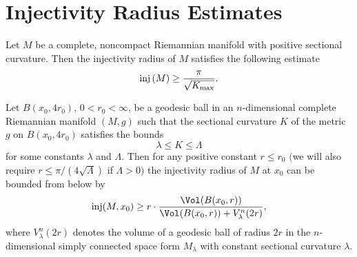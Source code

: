 \section{Injectivity Radius Estimates}
\begin{theorem}
  \label{thm:cz-gromollmeyer-injectivity-radius-estimate}
 Let $M$
be a complete, noncompact Riemannian manifold with positive
sectional curvature. Then the injectivity radius of $M$ satisfies
the following estimate
$$
{\rm inj}\,(M)\geq\frac{\pi}{\sqrt{K_{\max}}}.
$$
\end{theorem}
\begin{theorem}
  \label{thm:cz-local-injectivity-radius-estimate-from-volume-and-curvature}
Let $B(x_0, 4r_0)$, $0<r_0<\infty$, be a geodesic ball in an
$n$-dimensional complete Riemannian manifold $(M,g)$ such that the
sectional curvature $K$ of the metric $g$ on $B(x_0,4r_0)$
satisfies the bounds
$$
\lambda\leq K\leq\Lambda
$$
for some constants $\lambda$ and $\Lambda$. Then for any positive
constant $r\le r_0$ $($we will also require $r\le
\pi/(4\sqrt{\Lambda})$ if $\Lambda>0)$ the injectivity radius of
$M$ at $x_0$ can be bounded from below by
$$
\mbox{\rm inj}(M, x_0)\geq r\cdot\frac{\Vol(B(x_0,
r))}{\Vol(B(x_0,r))+V^n_{\lambda}(2r)},
$$
where $V_{\lambda}^n(2r)$ denotes the volume of a geodesic ball of
radius $2r$ in the $n$-dimensional simply connected space form
$M_{\lambda}$ with constant sectional curvature $\lambda$.
\end{theorem}

